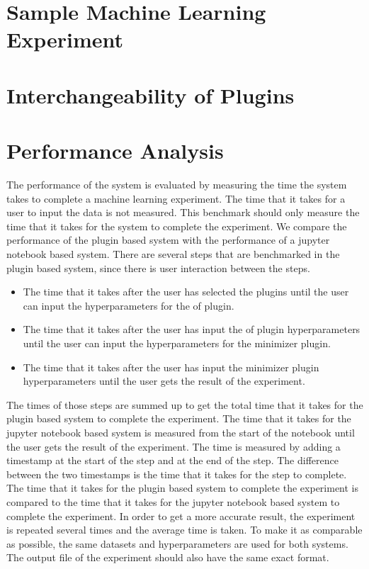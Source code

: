 \documentclass[
  a4paper,  %
  twoside,  %
  bibliography=totoc,
  headsepline,
  cleardoublepage=empty,
  parskip=half,
  draft=false
]{scrbook}
\begin{document}
\section{Sample Machine Learning Experiment}
\label{sec:sampleMachineLearningExperiment}
\section{Interchangeability of Plugins}
\label{sec:interchangeabilityOfPlugins}
\section{Performance Analysis}
\label{sec:performanceAnalysis}

The performance of the system is evaluated by measuring the time the system takes to complete a machine learning experiment.
The time that it takes for a user to input the data is not measured.
This benchmark should only measure the time that it takes for the system to complete the experiment.
We compare the performance of the plugin based system with the performance of a jupyter notebook based system.
There are several steps that are benchmarked in the plugin based system, since there is user interaction between the steps.
\begin{itemize}
  \item The time that it takes after the user has selected the plugins until the user can input the hyperparameters for the of plugin.
  \item The time that it takes after the user has input the of plugin hyperparameters until the user can input the hyperparameters for the minimizer plugin.
  \item The time that it takes after the user has input the minimizer plugin hyperparameters until the user gets the result of the experiment.
\end{itemize}
The times of those steps are summed up to get the total time that it takes for the plugin based system to complete the experiment.
The time that it takes for the jupyter notebook based system is measured from the start of the notebook until the user gets the result of the experiment.
The time is measured by adding a timestamp at the start of the step and at the end of the step.
The difference between the two timestamps is the time that it takes for the step to complete.
The time that it takes for the plugin based system to complete the experiment is compared to the time that it takes for the jupyter notebook based system to complete the experiment.
In order to get a more accurate result, the experiment is repeated several times and the average time is taken.
To make it as comparable as possible, the same datasets and hyperparameters are used for both systems.
The output file of the experiment should also have the same exact format.
\end{document}

